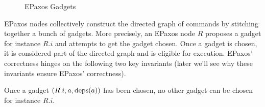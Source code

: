 \begin{figure}[h]
  \centering

  \begin{subfigure}[b]{0.19\textwidth}
  \end{subfigure}
  \begin{subfigure}[b]{0.49\textwidth}
  \end{subfigure}
  \begin{subfigure}[b]{0.29\textwidth}
  \end{subfigure}

  \caption{EPaxos Gadgets}
\end{figure}

EPaxos nodes collectively construct the directed graph of commands by stitching
together a bunch of gadgets. More precisely, an EPaxos node $R$ proposes a
gadget for instance $R.i$ and attempts to get the gadget chosen. Once a gadget
is chosen, it is considered part of the directed graph and is eligible for
execution. EPaxos' correctness hinges on the following two key invariants
(later we'll see why these invariants ensure EPaxos' correctness).

\begin{boxedinvariant}
  Once a gadget $(R.i, a, \text{deps}(a))$ has been chosen, no other gadget can be
  chosen for instance $R.i$.
\end{boxedinvariant}

